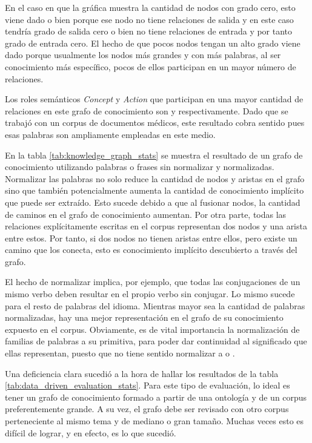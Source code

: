 En el caso en que la gráfica muestra la cantidad de nodos con grado cero, esto viene dado o bien porque ese nodo no tiene relaciones de salida y en este caso tendría grado de salida cero o bien no tiene relaciones de entrada y por tanto grado de entrada cero. El hecho de que pocos nodos tengan un alto grado viene dado porque usualmente los nodos más grandes y con más palabras, al ser conocimiento más específico, pocos de ellos participan en un mayor número de relaciones.

Los roles semánticos \textit{Concept} y \textit{Action} que participan en una mayor cantidad de relaciones en este grafo de conocimiento son  y  respectivamente. Dado que se trabajó con un corpus de documentos médicos, este resultado cobra sentido pues esas palabras son ampliamente empleadas en este medio.

En la tabla \ref{tab:knowledge_graph_stats} se muestra el resultado de un grafo de conocimiento utilizando palabras o frases sin normalizar y normalizadas. Normalizar las palabras no solo reduce la cantidad de nodos y aristas en el grafo sino que también potencialmente aumenta la cantidad de conocimiento implícito que puede ser extraído. Esto sucede debido a que al fusionar nodos, la cantidad de caminos en el grafo de conocimiento aumentan. Por otra parte, todas las relaciones explícitamente escritas en el corpus representan dos nodos y una arista entre estos. Por tanto, si dos nodos no tienen aristas entre ellos, pero existe un camino que los conecta, esto es conocimiento implícito descubierto a través del grafo.

El hecho de normalizar implica, por ejemplo, que todas las conjugaciones de un mismo verbo deben resultar en el propio verbo sin conjugar. Lo mismo sucede para el resto de palabras del idioma. Mientras mayor sea la cantidad de palabras normalizadas, hay una mejor representación en el grafo de su conocimiento expuesto en el corpus. Obviamente, es de vital importancia la normalización de familias de palabras a su primitiva, para poder dar continuidad al significado que ellas representan, puesto que no tiene sentido normalizar  a  o .

Una deficiencia clara sucedió a la hora de hallar los resultados de la tabla \ref{tab:data_driven_evaluation_stats}. Para este tipo de evaluación, lo ideal es tener un grafo de conocimiento formado a partir de una ontología y de un corpus preferentemente grande. A su vez, el grafo debe ser revisado con otro corpus perteneciente al mismo tema y de mediano o gran tamaño. Muchas veces esto es difícil de lograr, y en efecto, es lo que sucedió.

